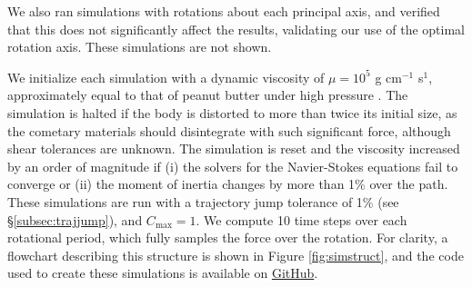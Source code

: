\documentclass[twocolumn,doublespacing]{aastex631}
\begin{document}
We also ran simulations with rotations about each principal axis, and verified that this does not significantly affect the results, validating our use of the optimal rotation axis. These simulations are not shown. 

We initialize each simulation with a dynamic viscosity of $\mu=10^5$ g cm$^{-1}$ s$^{1}$, approximately equal to that of peanut butter under high pressure \citep{citerne2001}. The simulation is halted if the body is distorted to more than twice its initial size, as the cometary materials should disintegrate with such significant force, although shear tolerances are unknown. The simulation is reset and the viscosity increased by an order of magnitude if (i) the solvers for the Navier-Stokes equations fail to converge or (ii) the moment of inertia changes by more than 1\% over the path. These simulations are run with a trajectory jump tolerance of 1\% (see \S \ref{subsec:trajjump}), and $C_{\text{max}}=1$. We compute 10 time steps over each rotational period, which fully samples the force over the rotation. For clarity, a flowchart describing this structure is shown in Figure \ref{fig:simstruct}, and the code used to create these simulations is available on \href{https://github.com/astertaylor/Oumuamua}{GitHub}.
\end{document}
